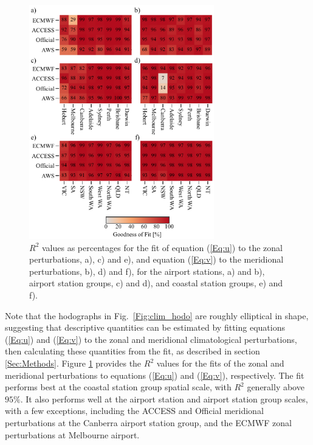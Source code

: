 \documentclass{ametsoc}
\begin{document}
\begin{figure}
\centering
\includegraphics[width=19pc]{r_squared.pdf}
\caption{$R^2$ values as percentages for the fit of equation (\ref{Eq:u}) to the zonal perturbations, a), c) and e), and equation (\ref{Eq:v}) to the meridional perturbations, b), d) and f), for the airport stations, a) and b), airport station groups, c) and d), and coastal station groups, e) and f).}
\label{Fig:r_squared}
\end{figure}

Note that the hodographs in Fig.~\ref{Fig:clim_hodo} are roughly elliptical in shape, suggesting that descriptive quantities can be estimated by fitting equations (\ref{Eq:u}) and (\ref{Eq:v}) to the zonal and meridional climatological perturbations, then calculating these quantities from the fit, as described in section \ref{Sec:Methods}. Figure \ref{Fig:r_squared} provides the $R^2$ values for the fits of the zonal and meridional perturbations to equations (\ref{Eq:u}) and (\ref{Eq:v}), respectively. The fit performs best at the coastal station group spatial scale, with $R^2$ generally above $95\%$. It also performs well at the airport station and airport station group scales, with a few exceptions, including the ACCESS and Official meridional perturbations at the Canberra airport station group, and the ECMWF zonal perturbations at Melbourne airport. 
\end{document}
